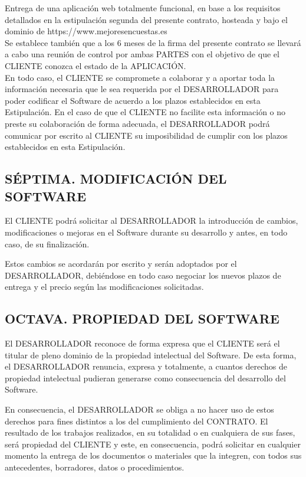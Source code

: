 \documentclass[a4paper,11pt]{report}
\begin{document}
	Entrega de una aplicación web totalmente funcional, en base a los requisitos detallados en la estipulación segunda del presente contrato, hosteada y bajo el dominio de https://www.mejoresencuestas.es
    \\
    
    Se establece también que a los 6 meses de la firma del presente contrato se llevará a cabo una reunión de control por ambas PARTES con el objetivo de que el CLIENTE conozca el estado de la APLICACIÓN.
    \\
    
	En todo caso, el CLIENTE se compromete a colaborar y a aportar toda la
	información necesaria que le sea requerida por el DESARROLLADOR para
	poder codificar el Software de acuerdo a los plazos establecidos en esta
	Estipulación. En el caso de que el CLIENTE no facilite esta información
	o no preste su colaboración de forma adecuada, el DESARROLLADOR podrá
	comunicar por escrito al CLIENTE su imposibilidad de cumplir con los
	plazos establecidos en esta Estipulación.

	\subsection*{SÉPTIMA. MODIFICACIÓN DEL SOFTWARE}

	El CLIENTE podrá solicitar al DESARROLLADOR la introducción de cambios,
	modificaciones o mejoras en el Software durante su desarrollo y antes,
	en todo caso, de su finalización.

	Estos cambios se acordarán por escrito y serán adoptados por el
	DESARROLLADOR, debiéndose en todo caso negociar los nuevos plazos de
	entrega y el precio según las modificaciones solicitadas.

	\subsection*{OCTAVA. PROPIEDAD DEL SOFTWARE}

	El DESARROLLADOR reconoce de forma expresa que el CLIENTE será el
	titular de pleno dominio de la propiedad intelectual del Software. De
	esta forma, el DESARROLLADOR renuncia, expresa y totalmente, a cuantos
	derechos de propiedad intelectual pudieran generarse como consecuencia
	del desarrollo del Software.

	En consecuencia, el DESARROLLADOR se obliga a no hacer uso de estos
	derechos para fines distintos a los del cumplimiento del CONTRATO. El
	resultado de los trabajos realizados, en su totalidad o en cualquiera de
	sus fases, será propiedad del CLIENTE y este, en consecuencia, podrá
	solicitar en cualquier momento la entrega de los documentos o materiales
	que la integren, con todos sus antecedentes, borradores, datos o
	procedimientos.
\end{document}
